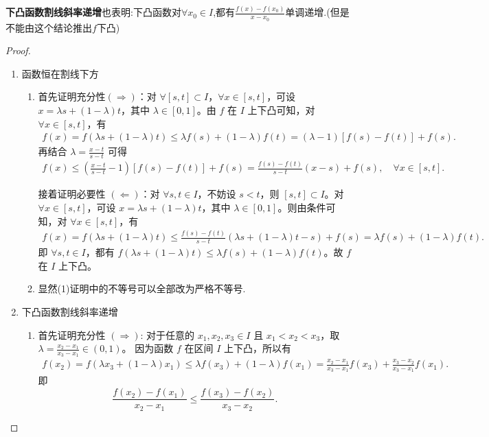 \documentclass[lang=cn,newtx,10pt,scheme=chinese]{elegantbook}
\begin{document}
\begin{note}
\textbf{下凸函数割线斜率递增}也表明:下凸函数对$\forall x_0\in I$,都有$\frac{f(x)-f(x_0)}{x-x_0}$单调递增.(但是不能由这个结论推出$f$下凸)
\end{note}
\begin{proof}
\begin{enumerate}
\item {\heiti 函数恒在割线下方}\begin{enumerate}[(1)]
\item 首先证明充分性$(\Rightarrow)$：对 $\forall [s,t] \subset I$，$\forall x\in [s,t]$，可设 $x = \lambda s+(1 - \lambda)t$，其中 $\lambda \in [0,1]$。由 $f$ 在 $I$ 上下凸可知，对 $\forall x\in [s,t]$，有
\begin{align*}
f(x) = f(\lambda s+(1 - \lambda)t) 
\leqslant \lambda f(s)+(1 - \lambda)f(t) 
= (\lambda - 1)[f(s) - f(t)]+f(s).
\end{align*}
再结合 $\lambda=\frac{x - t}{s - t}$ 可得
\begin{align*}
f(x) \leqslant \left(\frac{x - t}{s - t}-1\right)[f(s) - f(t)]+f(s)
= \frac{f(s) - f(t)}{s - t}(x - s)+f(s), \quad \forall x\in [s,t].
\end{align*}

接着证明必要性 $(\Leftarrow)$：对 $\forall s,t\in I$，不妨设 $s < t$，则 $[s,t] \subset I$。对 $\forall x\in [s,t]$，可设 $x = \lambda s+(1 - \lambda)t$，其中 $\lambda \in [0,1]$。则由条件可知，对 $\forall x\in [s,t]$，有
\begin{align*}
f(x) = f(\lambda s+(1 - \lambda)t) 
\leqslant \frac{f(s) - f(t)}{s - t}(\lambda s+(1 - \lambda)t - s)+f(s) 
= \lambda f(s)+(1 - \lambda)f(t).
\end{align*}
即 $\forall s,t\in I$，都有 $f(\lambda s+(1 - \lambda)t) \leqslant \lambda f(s)+(1 - \lambda)f(t)$。故 $f$ 在 $I$ 上下凸。      

\item 显然(1)证明中的不等号可以全部改为严格不等号.
\end{enumerate}

\item {\heiti 下凸函数割线斜率递增}\begin{enumerate}[(1)]
\item 首先证明充分性 $(\Rightarrow)$:
对于任意的 $x_1, x_2, x_3 \in I$ 且 $x_1 < x_2 < x_3$，取 $\lambda = \frac{x_2 - x_1}{x_3 - x_1} \in (0, 1)$。
因为函数 $f$ 在区间 $I$ 上下凸，所以有
\begin{align*}
f(x_2) = f(\lambda x_3 + (1 - \lambda) x_1) 
\leqslant \lambda f(x_3) + (1 - \lambda) f(x_1) 
= \frac{x_2 - x_1}{x_3 - x_1} f(x_3) + \frac{x_3 - x_2}{x_3 - x_1} f(x_1).
\end{align*}
即
\[
\frac{f(x_2) - f(x_1)}{x_2 - x_1} \leqslant \frac{f(x_3) - f(x_2)}{x_3 - x_2}.
\]


\end{enumerate}
\end{enumerate}
\end{proof}
\end{document}
